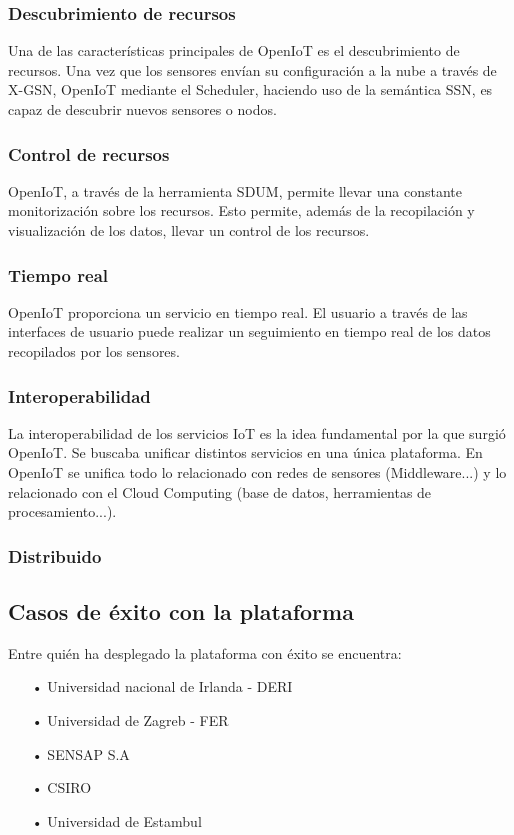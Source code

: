 \documentclass[12pt, twoside]{book}
\begin{document}
\subsubsection*{Descubrimiento de recursos}
Una de las características principales de OpenIoT es el descubrimiento de recursos. Una vez que los sensores envían su configuración a la nube a través de X-GSN, OpenIoT mediante el Scheduler, haciendo uso de la semántica SSN, es capaz de descubrir nuevos sensores o nodos.
\subsubsection*{Control de recursos}
OpenIoT, a través de la herramienta SDUM, permite llevar una constante monitorización sobre los recursos. Esto permite, además de la recopilación y visualización de los datos, llevar un control de los recursos.  
\subsubsection*{Tiempo real}
OpenIoT proporciona un servicio en tiempo real. El usuario a través de las interfaces de usuario puede realizar un seguimiento en tiempo real de los datos recopilados por los sensores.
\subsubsection*{Interoperabilidad}
La interoperabilidad de los servicios IoT es la idea fundamental por la que surgió OpenIoT. Se buscaba unificar distintos servicios en una única plataforma. En OpenIoT se unifica todo lo relacionado con redes de sensores (Middleware...) y lo relacionado con el Cloud Computing (base de datos, herramientas de procesamiento...).
\subsubsection*{Distribuido}
 \cmark 
\xmark


\subsection{Casos de éxito con la plataforma}
Entre quién ha desplegado la plataforma con éxito se encuentra:
\begin{itemize}
\item[•] Universidad nacional de Irlanda - DERI
\item[•] Universidad de Zagreb - FER
\item[•] SENSAP S.A
\item[•] CSIRO
\item[•] Universidad de Estambul
\end{itemize}
\end{document}
